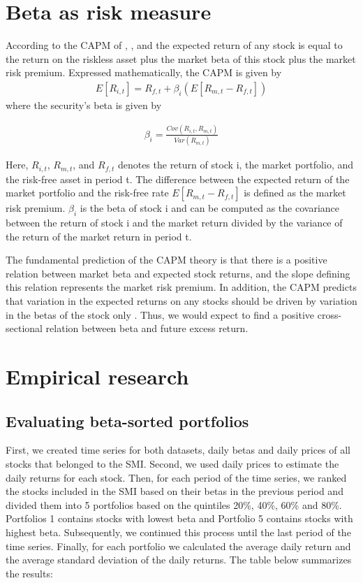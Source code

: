 \documentclass[12pt,a4paper]{article}
\begin{document}
\section{Beta as risk measure}
\begin{justify}
According to the CAPM of , , and  the expected return of any stock is equal to the return on the riskless asset plus the market beta of this stock plus the market risk premium. Expressed mathematically, the CAPM is given by
\begin{align}
    E[R_{i,t}] = R_{f,t}+\beta_{i}(E[R_{m,t}-R_{f,t}])
\end{align}
where the security’s beta is given by

\begin{align}
    \beta_{i} = \frac{Cov(R_{i,t},R_{m,t})}{Var(R_{m,t})} 
\end{align}

Here, $R_{i,t}$, $R_{m,t}$, and $R_{f,t}$ denotes the return of stock i, the market portfolio, and the risk-free asset in period t. The difference between the expected return of the market portfolio and the risk-free rate $E[R_{m,t}-R_{f,t}]$ is defined as the market risk premium. $\beta_{i}$ is the beta of stock i and can be computed as the covariance between the return of stock i and the market return divided by the variance of the return of the market return in period t.
 
The fundamental prediction of the CAPM theory is that there is a positive relation between market beta and expected stock returns, and the slope defining this relation represents the market risk premium. In addition, the CAPM predicts that variation in the expected returns on any stocks should be  driven by variation in the betas of the stock only \cite{Bali2016}. Thus, we would expect to find a positive cross-sectional relation between beta and future excess return.
\end{justify}

\section{Empirical research}
\subsection{Evaluating beta-sorted portfolios}
First, we created time series for both datasets, daily betas and daily prices of all stocks that belonged to the SMI. Second, we used daily prices to estimate the daily returns for each stock. Then, for each period of the time series, we ranked the stocks included in the SMI based on their betas in the previous period and divided them into 5 portfolios based on the quintiles 20\%, 40\%, 60\% and 80\%. Portfolios 1 contains stocks with lowest beta and Portfolio 5 contains stocks with highest beta. Subsequently, we continued this process until the last period of the time series. Finally, for each portfolio we calculated the average daily return and the average standard deviation of the daily returns. The table below summarizes the results:
~\\
\end{document}
